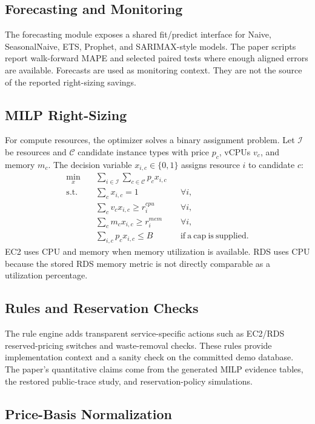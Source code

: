 \documentclass[11pt]{article}
\begin{document}
\subsection{Forecasting and Monitoring}

The forecasting module exposes a shared fit/predict interface for Naive,
SeasonalNaive, ETS, Prophet, and SARIMAX-style models. The paper scripts
report walk-forward MAPE and selected paired tests where enough aligned
errors are available. Forecasts are used as monitoring context. They are not
the source of the reported right-sizing savings.

\subsection{MILP Right-Sizing}

For compute resources, the optimizer solves a binary assignment problem. Let
$\mathcal{I}$ be resources and $\mathcal{C}$ candidate instance types with
price $p_c$, vCPUs $v_c$, and memory $m_c$. The decision variable
$x_{i,c}\in\{0,1\}$ assigns resource $i$ to candidate $c$:
\begin{align}
\min_x \quad & \sum_{i\in\mathcal{I}}\sum_{c\in\mathcal{C}} p_c x_{i,c}\\
\mathrm{s.t.}\quad & \sum_c x_{i,c}=1 && \forall i,\\
& \sum_c v_c x_{i,c}\ge r_i^{cpu} && \forall i,\\
& \sum_c m_c x_{i,c}\ge r_i^{mem} && \forall i,\\
& \sum_{i,c} p_c x_{i,c}\le B && \mathrm{if\ a\ cap\ is\ supplied}.
\end{align}
EC2 uses CPU and memory when memory utilization is available. RDS uses CPU
because the stored RDS memory metric is not directly comparable as a
utilization percentage.

\subsection{Rules and Reservation Checks}

The rule engine adds transparent service-specific actions such as EC2/RDS
reserved-pricing switches and waste-removal checks. These rules provide
implementation context and a sanity check on the committed demo database.
The paper's quantitative claims come from the generated MILP evidence tables,
the restored public-trace study, and reservation-policy simulations.

\subsection{Price-Basis Normalization}
\end{document}
